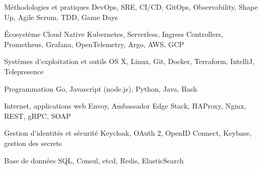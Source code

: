 
\begin{cvskills}

  \cvskill
    {Méthodologies et pratiques} %
    {DevOps, SRE, CI/CD, GitOps, Observability, Shape Up, Agile Scrum, TDD, Game Days} %

  \cvskill
    {Écosystème Cloud Native} %
    {Kubernetes, Serverless, Ingress Controllers, Prometheus, Grafana, OpenTelemetry, Argo, AWS, GCP} %

  \cvskill
    {Systèmes d'exploitation et outils} %
    {OS X, Linux, Git, Docker, Terraform, IntelliJ, Telepresence} %

  \cvskill
    {Programmation} %
    {Go, Javascript (node.js), Python, Java, Bash} %

  \cvskill
    {Internet, applications web} %
    {Envoy, Ambassador Edge Stack, HAProxy, Nginx, REST, gRPC, SOAP} %

  \cvskill
    {Gestion d'identités et sécurité} %
    {Keycloak, OAuth 2, OpenID Connect, Keybase, gestion des secrets} %

  \cvskill
    {Base de données} %
    {SQL, Consul, etcd, Redis, ElasticSearch} %

\end{cvskills}